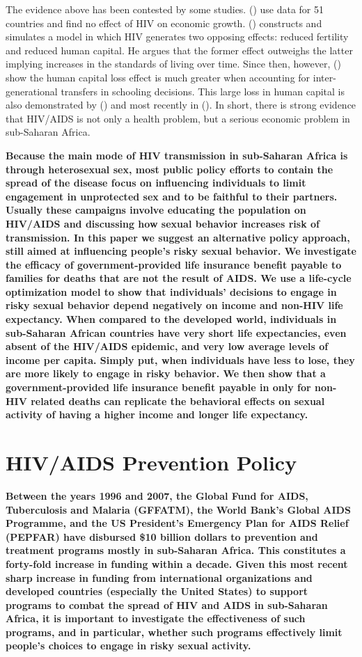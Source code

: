 \documentclass[12pt]{article}
\newcommand{\citee}[1]{\citename{#1} (\citeyear{#1})}
\begin{document}
The evidence above has been contested by some studies. \citee{BM1997} use data for 51 countries and find no effect of HIV on economic growth. \citee{AY2005a} constructs and simulates a model in which HIV generates two opposing effects: reduced fertility and reduced human capital. He argues that the former effect outweighs the latter implying increases in the standards of living over time. Since then, however, \citee{CGM2005} show the human capital loss effect is much greater when accounting for inter-generational transfers in schooling decisions.  This large loss in human capital is also demonstrated by \citee{HB2002} and most recently in \citee{JF2008}.  In short, there is strong evidence that HIV/AIDS is not only a health problem, but a serious economic problem in sub-Saharan Africa.

\textbf{Because the main mode of HIV transmission in sub-Saharan Africa is through heterosexual sex, most public policy efforts to contain the spread of the disease focus on influencing individuals to limit engagement in unprotected sex and to be faithful to their partners.  Usually these campaigns involve educating the population on HIV/AIDS and discussing how sexual behavior increases risk of transmission.  In this paper we suggest an alternative policy approach, still aimed at influencing people's risky sexual behavior.  We investigate the efficacy of government-provided life insurance benefit payable to families for deaths that are not the result of AIDS.  We use a life-cycle optimization model to show that individuals' decisions to engage in risky sexual behavior depend negatively on income and non-HIV life expectancy.  When compared to the developed world, individuals in sub-Saharan African countries have very short life expectancies, even absent of the HIV/AIDS epidemic, and very low average levels of income per capita.  Simply put, when individuals have less to lose, they are more likely to engage in risky behavior.  We then show that a government-provided life insurance benefit payable in only for non-HIV related deaths can replicate the behavioral effects on sexual activity of having a higher income and longer life expectancy.}

\section{HIV/AIDS Prevention Policy}
\textbf{Between the years 1996 and 2007, the Global Fund for AIDS, Tuberculosis and Malaria (GFFATM), the World Bank's Global AIDS Programme, and the US President's Emergency Plan for AIDS Relief (PEPFAR) have disbursed \$10 billion dollars to prevention and treatment programs mostly in sub-Saharan Africa. This constitutes a forty-fold increase in funding within a decade.  Given this most recent sharp increase in funding from international organizations and developed countries (especially the United States) to support programs to combat the spread of HIV and AIDS in sub-Saharan Africa, it is important to investigate the effectiveness of such programs, and in particular, whether such programs effectively limit people's choices to engage in risky sexual activity.}
\end{document}
